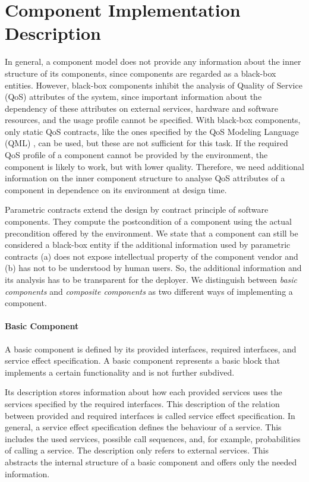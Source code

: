 \section{Component Implementation Description}
\label{sec:ComponentImplementation}

In general, a component model does not provide any information about the inner
structure of its components, since components are regarded as a black-box
entities. However, black-box components inhibit the analysis of Quality of
Service (QoS) attributes of the system, since important information about the
dependency of these attributes on external services, hardware and software
resources, and the usage profile cannot be specified.  With black-box
components, only static QoS contracts, like the ones specified by the QoS
Modeling Language (QML) \cite{frolund1998a}, can be used, but these are not
sufficient for this task. If the required QoS profile of a component cannot be
provided by the environment, the component is likely to work, but with lower
quality. Therefore, we need additional information on the inner component
structure to analyse QoS attributes of a component in dependence on its
environment at design time.

Parametric contracts \cite{TODO:reference} extend the design by contract
principle of software components. They compute the postcondition of a component
using the actual precondition offered by the environment. We state that a
component can still be considered a black-box entity if the additional
information used by parametric contracts (a) does not expose intellectual
property of the component vendor and (b) has not to be understood by human
users. So, the additional information and its analysis has to be transparent
for the deployer. We distinguish between \emph{basic components} and
\emph{composite components} as two different ways of implementing a component.

\paragraph*{Basic Component}
A basic component is defined by its provided interfaces, required interfaces,
and service effect specification. A basic component represents a basic block
that implements a certain functionality and is not further subdived. 

Its description stores information about how each provided services uses the
services specified by the required interfaces. This description of the relation
between provided and required interfaces is called service effect
specification. In general, a service effect specification defines the
behaviour of a service. This includes the used services, possible call
sequences, and, for example, probabilities of calling a service. The description
only refers to external services.
This abstracts the internal structure of a basic component and offers only the
needed information.

